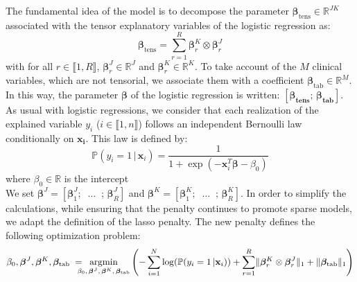 \documentclass[10pt]{article}
\begin{document}
\noindent The fundamental idea of the model is to decompose the parameter $\bm{\beta}_{\text{tens}} \in \mathbb{R}^{JK}$ associated with the tensor explanatory variables of the logistic regression as:
\begin{equation}
    \bm{\beta}_{\text{tens}} = \sum\limits_{r = 1}^R\bm{\beta}_r^K \otimes \bm{\beta}_r^J
\end{equation}
with for all $r \in \llbracket 1 ,R \rrbracket$, $\bm{\beta}_r^J \in \mathbb{R}^J$ and $\bm{\beta}_r^K \in \mathbb{R}^K$. To take account of the $M$ clinical variables, which are not tensorial, we associate them with a coefficient $\bm{\beta}_{\text{tab}} \in \mathbb{R}^M$. In this way, the parameter $\bm{\beta}$ of the logistic regression is written: $\left[\bm{\beta_{\text{tens}}}; \, \bm{\beta_{\text{tab}}} \right]$.\\
As usual with logistic regressions, we consider that each realization of the explained variable $y_i$ ($i \in \llbracket 1, n \rrbracket$) follows an independent Bernoulli law conditionally on $\mathbf{x_i}$. This law is defined by:
\begin{equation}
    \label{eqref:vraisemblance}
    \mathbb{P}( y_i = 1\, | \, \mathbf{x}_i) = \frac{1}{1 + \exp(- \mathbf{x}_i^T \bm{\beta} - \beta_0)}
\end{equation}
where  $\beta_0 \in \mathbb{R}$ is the intercept\\ %

\noindent We set  $\bm{\beta}^J = \left[\bm{\beta}_1^J ; \;\; \hdots \; \; ;\,\bm{\beta}_R^J \right]$ and  $\bm{\beta}^K = \left[\bm{\beta}_1^K; \; \; \hdots \; \; ;\,\bm{\beta}_R^K \right]$.
\vspace{5 pt}
\noindent In order to simplify the calculations, while ensuring that the penalty continues to promote sparse models, we adapt the definition of the lasso penalty. The new penalty defines the following optimization problem: %
\begin{equation}
    \beta_0, \bm{\beta}^J, \bm{\beta}^K, \bm{\beta}_{\text{tab}} \; = \hspace{-8pt} \underset{\beta_0 ,\, \bm{\beta}^J, \, \bm{\beta}^K, \, \bm{\beta}_{\text{tab}}}{\text{argmin}} \left( - \sum\limits_{i = 1}^{N} \log(\mathbb{P}(y_i = 1 \, | \mathbf{x}_i)) + \sum\limits_{r = 1}^R
    \lVert \bm{\beta}_r^K \otimes \bm{\beta}_r^J \rVert_1 + \lVert \bm{\beta}_{\text{tab}} \rVert_1 \right)
\end{equation}
\end{document}
